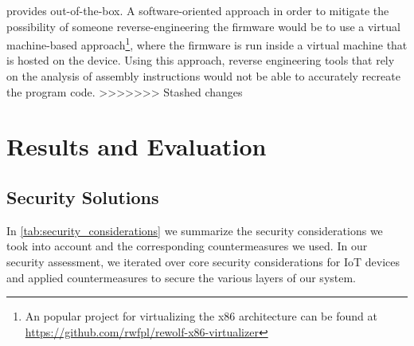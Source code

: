 \documentclass[conference]{IEEEtran}
\begin{document}
provides out-of-the-box.
A software-oriented approach in order to mitigate the possibility of someone reverse-engineering the firmware would be to use
a virtual machine-based approach\footnote{An popular project for virtualizing the x86 architecture can be found at \url{https://github.com/rwfpl/rewolf-x86-virtualizer}},
where the firmware is run inside a virtual machine that is hosted on the device.
Using this approach, reverse engineering tools that rely on the analysis of
assembly instructions would not be able to accurately recreate the program
code.
>>>>>>> Stashed changes

\section{Results and Evaluation}

\subsection{Security Solutions}

In \cref{tab:security_considerations} we summarize the security considerations we took into account and the corresponding countermeasures we used.
In our security assessment, we iterated over core security considerations for IoT devices\cite{ComprehensiveSecurity} and applied countermeasures 
to secure the various layers of our system.
\end{document}
